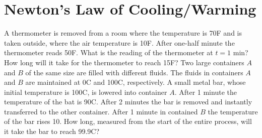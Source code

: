 \documentclass[12pt]{report}
\begin{document}
\section{Newton's Law of Cooling/Warming}\label{sec:newton's-law-of-cooling/warming}
\begin{enumerate}[label=\arabic*., start=13]
	 A thermometer is removed from a room where the temperature is 70\textdegree F and is taken outside, where the air temperature is 10\textdegree F. After one-half minute the thermometer reads 50\textdegree F. What is the reading of the thermometer at $t=1$ min? How long will it take for the thermometer to reach 15\textdegree F?
	\setcounter{enumi}{15}
	 Two large containers $A$ and $B$ of the same size are filled with different fluids. The fluids in containers $A$ and $B$ are maintained at 0\textdegree C and 100\textdegree C, respectively. A small metal bar, whose initial temperature is 100\textdegree C, is lowered into container $A$. After 1 minute the temperature of the bat is 90\textdegree C. After 2 minutes the bar is removed and instantly transferred to the other container. After 1 minute in contained $B$ the temperature of the bar rises 10\textdegree. How long, measured from the start of the entire process, will it take the bar to reach 99.9\textdegree C?
\end{enumerate}
\end{document}

